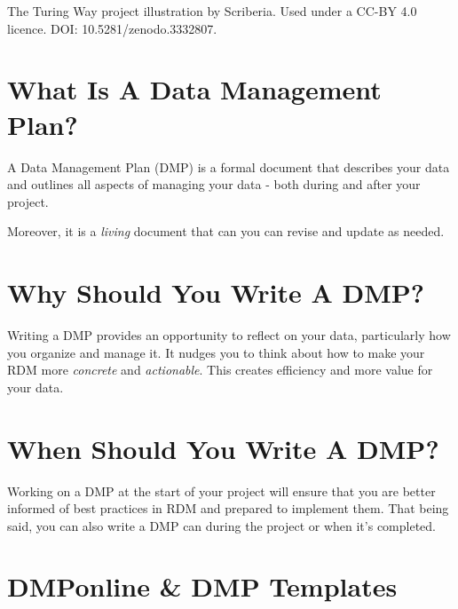 \documentclass[
  letterpaper,
  DIV=11,
  numbers=noendperiod]{scrreprt}
\begin{document}
The Turing Way project illustration by Scriberia. Used under a CC-BY 4.0
licence. DOI: 10.5281/zenodo.3332807.

\section*{What Is A Data Management
Plan?}\label{what-is-a-data-management-plan}


A Data Management Plan (DMP) is a formal document that describes your
data and outlines all aspects of managing your data - both during and
after your project.

Moreover, it is a \emph{living} document that can you can revise and
update as needed.

\section*{Why Should You Write A DMP?}\label{why-should-you-write-a-dmp}


Writing a DMP provides an opportunity to reflect on your data,
particularly how you organize and manage it. It nudges you to think
about how to make your RDM more \emph{concrete} and \emph{actionable}.
This creates efficiency and more value for your data.

\section*{When Should You Write A
DMP?}\label{when-should-you-write-a-dmp}


Working on a DMP at the start of your project will ensure that you are
better informed of best practices in RDM and prepared to implement them.
That being said, you can also write a DMP can during the project or when
it's completed.

\section*{DMPonline \& DMP Templates}\label{dmponline-dmp-templates}
\end{document}
